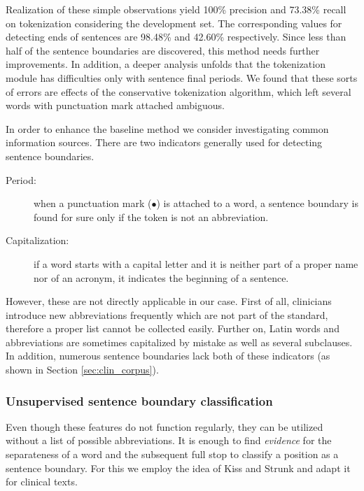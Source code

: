 Realization of these simple observations yield 100\% precision and 73.38\% recall on tokenization considering the development set. 
The corresponding values for detecting ends of sentences are 98.48\% and 42.60\% respectively. 
Since less than half of the sentence boundaries are discovered, this method needs further improvements.
In addition, a deeper analysis unfolds that the tokenization module has difficulties only with sentence final periods. 
We found that these sorts of errors are effects of the conservative tokenization algorithm, which left several words with punctuation mark attached ambiguous.


In order to enhance the baseline method we consider investigating common information sources. 
There are two indicators generally used for detecting sentence boundaries.
\begin{description}
 \item[Period:] when a punctuation mark ($\bullet$) is attached to a word, a sentence boundary is found for sure only if the token is not an abbreviation.
 \item[Capitalization:] if a word starts with a capital letter and it is neither part of a proper name nor of an acronym, it indicates the beginning of a sentence.
\end{description}

However, these are not directly applicable in our case. 
First of all, clinicians introduce new abbreviations frequently which are not part of the standard, therefore a proper list cannot be collected easily. 
Further on, Latin words and abbreviations are sometimes capitalized by mistake as well as several subclauses. 
In addition, numerous sentence boundaries lack both of these indicators (as shown in Section \ref{sec:clin_corpus}).

\subsubsection{Unsupervised sentence boundary classification}

Even though these features do not function regularly, they can be utilized without a list of possible abbreviations. 
It is enough to find \emph{evidence} for the separateness of a word and the subsequent full stop to classify a position as a sentence boundary. 
For this we employ the idea of Kiss and Strunk \cite{kiss2006unsupervised} and adapt it for clinical texts.

